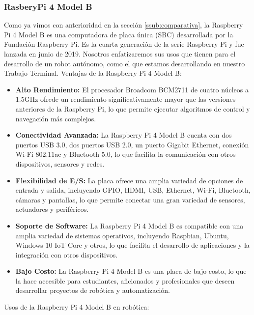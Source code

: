 \subsubsection{RasberyPi 4 Model B} %
\label{subsubsection:rasp4}
    Como ya vimos con anterioridad en la secci\'on \ref{ssub:comparativa}, la Raspberry Pi 4 Model B es una computadora de placa \'unica 
        (SBC) desarrollada por la Fundaci\'on Raspberry Pi. Es la cuarta generaci\'on de la serie Raspberry Pi y fue lanzada en 
        junio de 2019. Nosotros enfatizaremos sus usos que tienen para el desarrollo de un robot aut\'onomo, como el que estamos
        desarrollando en nuestro Trabajo Terminal.
    \vskip 0.5cm
    Ventajas de la Raspberry Pi 4 Model B:
    \begin{itemize}
        \item \textbf{Alto Rendimiento:} El procesador Broadcom BCM2711 de cuatro n\'ucleos a 1.5GHz ofrede un rendimiento 
            significativamente mayor que las versiones anteriores de la Raspberry Pi, lo que permite ejecutar algoritmos 
            de control y navegaci\'on m\'as complejos.
        \item \textbf{Conectividad Avanzada:} La Raspberry Pi 4 Model B cuenta con dos puertos USB 3.0, dos puertos USB 2.0, 
            un puerto Gigabit Ethernet, conexi\'on Wi-Fi 802.11ac y Bluetooth 5.0, lo que facilita la comunicaci\'on con otros
            dispositivos, sensores y redes.
        \item \textbf{Flexibilidad de E/S:} La placa ofrece una amplia variedad de opciones de entrada y salida, incluyendo
            GPIO, HDMI, USB, Ethernet, Wi-Fi, Bluetooth, c\'amaras y pantallas, lo que permite conectar una gran variedad de
            sensores, actuadores y perif\'ericos.
        \item \textbf{Soporte de Software:} La Raspberry Pi 4 Model B es compatible con una amplia variedad de sistemas
            operativos, incluyendo Raspbian, Ubuntu, Windows 10 IoT Core y otros, lo que facilita el desarrollo de aplicaciones
            y la integraci\'on con otros dispositivos.
        \item \textbf{Bajo Costo:} La Raspberry Pi 4 Model B es una placa de bajo costo, lo que la hace accesible para
            estudiantes, aficionados y profesionales que deseen desarrollar proyectos de rob\'otica y automatizaci\'on.
    \end{itemize}
    \vskip 0.5cm
    Usos de la Raspberry Pi 4 Model B en rob\'otica:
